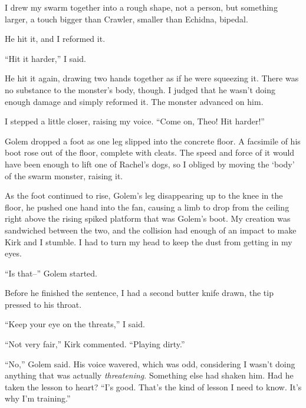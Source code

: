 I drew my swarm together into a rough shape, not a person, but something larger, a touch bigger than Crawler, smaller than Echidna, bipedal.



He hit it, and I reformed it.



``Hit it harder,'' I said.



He hit it again, drawing two hands together as if he were squeezing it.  There was no substance to the monster's body, though.  I judged that he wasn't doing enough damage and simply reformed it.  The monster advanced on him.



I stepped a little closer, raising my voice.  ``Come on, Theo!  Hit harder!''



Golem dropped a foot as one leg slipped into the concrete floor.  A facsimile of his boot rose out of the floor, complete with cleats.  The speed and force of it would have been enough to lift one of Rachel's dogs, so I obliged by moving the `body' of the swarm monster, raising it.



As the foot continued to rise, Golem's leg disappearing up to the knee in the floor, he pushed one hand into the fan, causing a limb to drop from the ceiling right above the rising spiked platform that was Golem's boot.  My creation was sandwiched between the two, and the collision had enough of an impact to make Kirk and I stumble.  I had to turn my head to keep the dust from getting in my eyes.



``Is that--'' Golem started.



Before he finished the sentence, I had a second butter knife drawn, the tip pressed to his throat.



``Keep your eye on the threats,'' I said.



``Not very fair,'' Kirk commented.  ``Playing dirty.''



``No,'' Golem said.  His voice wavered, which was odd, considering I wasn't doing anything that was actually \emph{threatening}.  Something else had shaken him.  Had he taken the lesson to heart?  ``I's good.  That's the kind of lesson I need to know.  It's why I'm training.''



